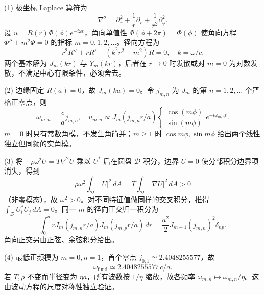 (1) 极坐标 Laplace 算符为
\[
\nabla^2=\partial_r^2+\frac1r\partial_r+\frac1{r^2}\partial_\phi^2.
\]
设 \(u=R(r)\Phi(\phi)e^{-i\omega t}\)，角向单值性 \(\Phi(\phi+2\pi)=\Phi(\phi)\) 使角向方程 \(\Phi''+m^2\Phi=0\) 的指标 \(m=0,1,2,\ldots\)。径向方程为
\[
r^2R''+rR'+(k^2r^2-m^2)R=0,\quad k=\omega/c.
\]
两个基本解为 \(J_m(kr)\) 与 \(Y_m(kr)\)，后者在 \(r\to0\) 时发散或对 \(m=0\) 为对数发散，不满足中心有限条件，必须舍去。

(2) 边缘固定 \(R(a)=0\)，故 \(J_m(ka)=0\)。令 \(j_{m,n}\) 为 \(J_m\) 的第 \(n=1,2,\ldots\) 个严格正零点，则
\[
\omega_{m,n}=\frac ca j_{m,n},\quad
u_{m,n}\propto J_m(j_{m,n}r/a)
\begin{cases}
\cos(m\phi)\\ \sin(m\phi)
\end{cases}e^{-i\omega_{m,n}t}.
\]
\(m=0\) 时只有常数角模，不发生角简并；\(m\ge1\) 时 \(\cos m\phi,\sin m\phi\) 给出两个线性独立但同频的实角模。

(3) 将 \(-\rho\omega^2U=T\nabla^2U\) 乘以 \(U^*\) 后在圆盘 \(\mathcal D\) 积分，边界 \(U=0\) 使分部积分边界项消失，得到
\[
\rho\omega^2\int_{\mathcal D}|U|^2\,dA
=T\int_{\mathcal D}|\nabla U|^2\,dA>0
\]
（非零模态），故 \(\omega^2>0\)。对不同特征值做同样的交叉积分，推得 \(\int_{\mathcal D}U_i^*U_j\,dA=0\)。同一 \(m\) 的径向正交归一积分为
\[
\int_0^a rJ_m(j_{m,n}r/a)J_m(j_{m,p}r/a)\,dr
=\frac{a^2}{2}J_{m+1}(j_{m,n})^2\delta_{np}.
\]
角向正交另由正弦、余弦积分给出。

(4) 最低正频模为 \(m=0,n=1\)，首个零点 \(j_{0,1}\simeq2.4048255577\)，故
\[
\omega_{\mathrm{fund}}\simeq2.4048255577\,c/a.
\]
若 \(T,\rho\) 不变而半径变为 \(\eta a\)，所有波数按 \(1/\eta\) 缩放，故各频率 \(\omega_{m,n}\mapsto\omega_{m,n}/\eta\)。这由波动方程的尺度对称性独立验证。

